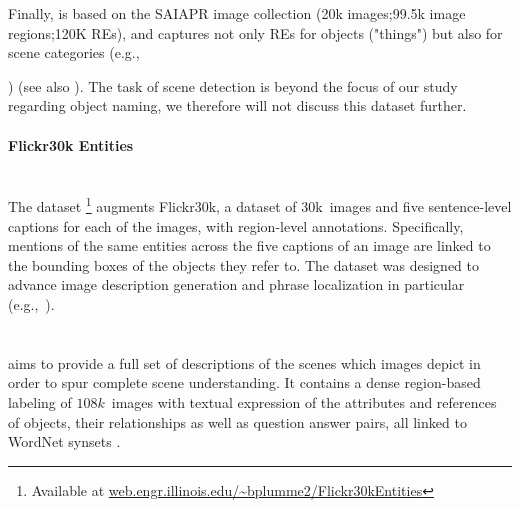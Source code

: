 Finally,  is based on the SAIAPR image collection \cite{Grubinger2006} (20k images;99.5k image regions;120K REs), and captures not only REs for objects ("things") but also for scene categories (e.g.,{) (see also \cite{hu2015,mao2016generation}). 
The task of scene detection is beyond the focus of our study regarding object naming, we therefore will not discuss this dataset further.

\paragraph{Flickr30k Entities}~\\
The \flickr dataset \cite{plummer2015flickr30kentities}\footnote{Available at  \url{web.engr.illinois.edu/~bplumme2/Flickr30kEntities}}  augments Flickr30k, a dataset of 30k~images and five sentence-level captions for each of the images, with region-level annotations. 
Specifically, mentions of the same entities across the five captions of an image are linked to the bounding boxes of the objects they refer to. 
The dataset was designed to advance image description generation and phrase localization in particular (e.g.,~\cite{rohrbach2016grounding,plummer2017phrase,yeh2018unsupervised}). 
%
%

\paragraph{\vgenome}~\\
\vgenome \cite{krishna2016visualgenome} aims to provide a full set of descriptions of the scenes which images depict in order to spur complete scene understanding. 
It contains a dense region-based labeling of $108k$~images with textual expression of the attributes and references of objects, their relationships as well as question answer pairs, all linked to WordNet synsets \cite[see below]{fellbaum1998wordnet}. 

}
